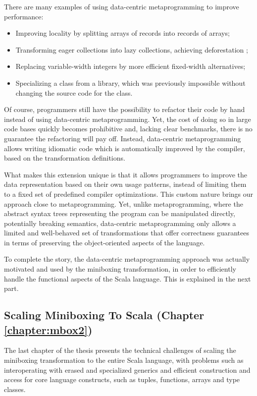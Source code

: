 There are many examples of using data-centric metaprogramming to improve performance:
\begin{itemize}
  \item Improving locality by splitting arrays of records into records of arrays;
  \item Transforming eager collections into lazy collections, achieving deforestation \cite{wadler-deforestation};
  \item Replacing variable-width integers by more efficient fixed-width alternatives;
  \item Specializing a class from a library, which was previously impossible without changing the source code for the class.
\end{itemize}

Of course, programmers still have the possibility to refactor their code by hand instead of using data-centric metaprogramming. Yet, the cost of doing so in large code bases quickly becomes prohibitive and, lacking clear benchmarks, there is no guarantee the refactoring will pay off. Instead, data-centric metaprogramming allows writing idiomatic code which is automatically improved by the compiler, based on the transformation definitions.

What makes this extension unique is that it allows programmers to improve the data representation based on their own usage patterns, instead of limiting them to a fixed set of predefined compiler optimizations. This custom nature brings our approach close to metaprogramming. Yet, unlike metaprogramming, where the abstract syntax trees representing the program can be manipulated directly, potentially breaking semantics, data-centric metaprogramming only allows a limited and well-behaved set of transformations that offer correctness guarantees in terms of preserving the object-oriented aspects of the language.

To complete the story, the data-centric metaprogramming approach was actually motivated and used by the miniboxing transformation, in order to efficiently handle the functional aspects of the Scala language. This is explained in the next part.


\subsection{Scaling Miniboxing To Scala (Chapter \ref{chapter:mbox2})}

The last chapter of the thesis presents the technical challenges of scaling the miniboxing transformation to the entire Scala language, with problems such as interoperating with erased and specialized generics and efficient construction and access for core language constructs, such as tuples, functions, arrays and type classes.

